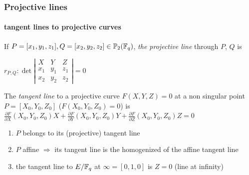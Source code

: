 \documentclass[10pt,handout]{beamer} %
\begin{document}
\begin{frame}
\frametitle{Projective lines}
\framesubtitle{tangent lines to projective curves}

\begin{Definition}
If $P=[x_1,y_1,z_1], Q=[x_2,y_2,z_2]\in\mathbb P_2(\mathbb F_q)$, \emph{the projective
line} through $P$, $Q$ is\\
\centerline{$r_{P,Q}: \det\left|\begin{matrix}
                      X & Y & Z \\ x_1&y_1&z_1\\ x_2&y_2&z_2
                     \end{matrix}\right|=0$}
\end{Definition}\pause

\begin{Definition}
The \emph{tangent line} to a projective curve $F(X,Y,Z)=0$ at a non singular point $P=[X_0,Y_0,Z_0]$
($F(X_0,Y_0,Z_0)=0$) is
\scriptsize{{\color[cmyk]{1,0,1,0.5}$\frac{\partial F}{\partial X}(X_0,Y_0,Z_0)X+\frac{\partial F}{\partial Y}(X_0,Y_0,Z_0)Y+
\frac{\partial F}{\partial Z}(X_0,Y_0,Z_0)Z=0$}}
\end{Definition}\pause

\begin{exercise}
\begin{enumerate}[<+-| alert@+>]
 \item $P$ belongs to its (projective) tangent line
 \item $P$ affine $\Rightarrow$ its tangent line is the homogenized of the affine tangent line
 \item the tangent line to $E/\mathbb F_q$ at $\infty=[0,1,0]$ is $Z=0$ (line at infinity)\vspace*{-5.2pt}
\end{enumerate}
\end{exercise}
\end{frame}
\end{document}
